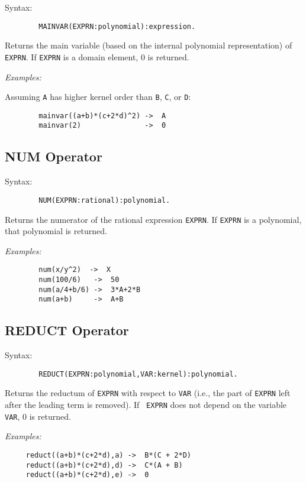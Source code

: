 Syntax:
\begin{verbatim}
        MAINVAR(EXPRN:polynomial):expression.
\end{verbatim}
Returns the main variable (based on the internal polynomial representation)
of \texttt{EXPRN}. If \texttt{EXPRN} is a domain element, 0 is returned.

\textit{Examples:}

Assuming \texttt{A} has higher kernel order than \texttt{B}, \texttt{C}, or \texttt{D}:
\begin{verbatim}
        mainvar((a+b)*(c+2*d)^2) ->  A
        mainvar(2)               ->  0
\end{verbatim}

\subsection{NUM Operator}
\hypertarget{operator:NUM}{}

Syntax:
\begin{verbatim}
        NUM(EXPRN:rational):polynomial.
\end{verbatim}
Returns the numerator of the rational expression \texttt{EXPRN}.  If \texttt{EXPRN}
is a polynomial, that polynomial is returned.

\textit{Examples:}
\begin{verbatim}
        num(x/y^2)  ->  X
        num(100/6)   ->  50
        num(a/4+b/6) ->  3*A+2*B
        num(a+b)     ->  A+B
\end{verbatim}

\subsection{REDUCT Operator}
\hypertarget{operator:REDUCT}{}

Syntax:
\begin{verbatim}
        REDUCT(EXPRN:polynomial,VAR:kernel):polynomial.
\end{verbatim}
Returns the reductum of \texttt{EXPRN} with respect to \texttt{VAR} (i.e., the
part of \texttt{EXPRN} left after the leading term is removed).  If {\tt
EXPRN} does not depend on the variable \texttt{VAR}, 0 is returned.

\textit{Examples:}
\begin{verbatim}
     reduct((a+b)*(c+2*d),a) ->  B*(C + 2*D)
     reduct((a+b)*(c+2*d),d) ->  C*(A + B)
     reduct((a+b)*(c+2*d),e) ->  0
\end{verbatim}

